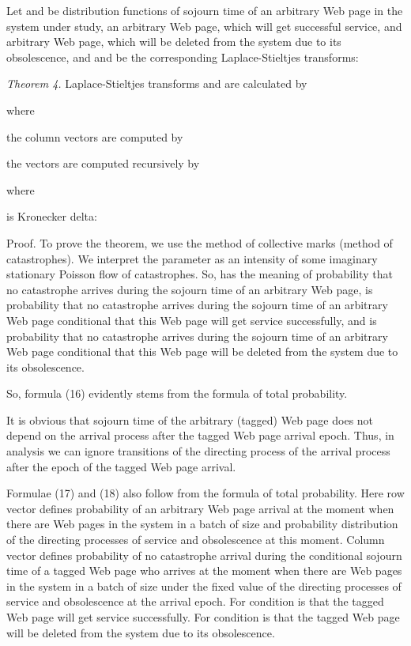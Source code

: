 \documentclass[11pt]{article}
\begin{document}
Let   and  be distribution functions of
sojourn time of an arbitrary Web page in the system under study, an
arbitrary Web page, which will get successful service, and arbitrary
Web page, which will be deleted from the system due to its
obsolescence, and  and  be the
corresponding Laplace-Stieltjes transforms:



{\it Theorem 4.}  Laplace-Stieltjes transforms 
and  are calculated by

 

where

the column vectors  are computed by


 the vectors  are computed
recursively by



where

 is Kronecker delta: 

Proof. To prove the theorem, we use the method of collective marks
(method of catastrophes). We interpret the parameter   as an
intensity of some imaginary stationary Poisson flow of catastrophes.
So,  has the meaning of probability that no catastrophe
arrives during the sojourn time of an arbitrary Web page,
  is probability that no catastrophe arrives during
the sojourn time of an arbitrary Web page conditional  that this
Web page will get service successfully, and  is
probability that no catastrophe arrives during the sojourn time
of an arbitrary Web page conditional  that this Web page will be
deleted from the system due to its obsolescence.

So, formula (16) evidently stems from the formula of total
probability.

It is obvious that sojourn time of the arbitrary (tagged) Web page
does not depend on the arrival process after the tagged Web page
arrival epoch. Thus,  in analysis we can ignore transitions of the
directing process of the arrival process after the epoch of the
tagged Web page arrival.

Formulae (17) and (18) also follow from the formula of total
probability. Here row vector  defines probability
of an arbitrary Web page arrival at the moment when there are 
Web pages in the system in a batch of size  and probability
distribution of the directing processes of service and obsolescence
at this moment. Column vector  defines
probability of no catastrophe arrival during the conditional
sojourn time of a tagged Web page who arrives at the moment when
there are  Web pages in the system in a batch of size  under
the fixed value of the directing processes of service and
obsolescence at the arrival epoch. For  condition is that the
tagged Web page will get service successfully. For  condition
is that the tagged Web page will be deleted from the system due to
its obsolescence.
\end{document}
